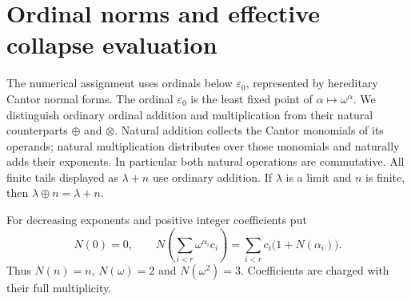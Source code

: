 \section{Ordinal norms and effective collapse evaluation}
\label{f:sec:foundations}

The numerical assignment uses ordinals below $\varepsilon_0$, represented
by hereditary Cantor normal forms.  The ordinal $\varepsilon_0$ is the
least fixed point of $\alpha\mapsto\omega^\alpha$.  We distinguish
ordinary ordinal addition and multiplication from their natural
counterparts $\oplus$ and $\otimes$.  Natural addition collects the
Cantor monomials of its operands; natural multiplication distributes over
those monomials and naturally adds their exponents.  In particular both
natural operations are commutative.  All finite tails displayed as
$\lambda+n$ use ordinary addition.  If $\lambda$ is a limit and $n$ is
finite, then $\lambda\oplus n=\lambda+n$.

\begin{definition}\label{f:def:additive-norm}
For decreasing exponents and positive integer coefficients put
\[
 N(0)=0,\qquad
 N\left(\sum_{i<r}\omega^{\alpha_i}c_i\right)
       =\sum_{i<r}c_i\bigl(1+N(\alpha_i)\bigr).
\]
Thus $N(n)=n$, $N(\omega)=2$ and $N(\omega^2)=3$.
Coefficients are charged with their full multiplicity.
\end{definition}


